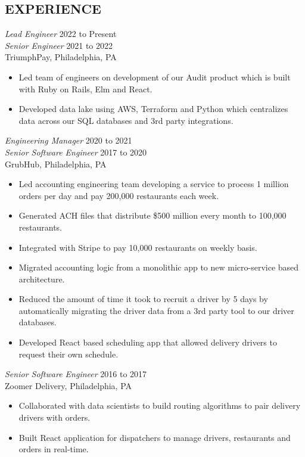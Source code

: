 \documentclass[line]{style}
\begin{document}
\newsectionwidth{0in}

\address{michaelcdalton@gmail.com}
\address{linkedin.com/in/michaelcdalton}

\begin{resume}

\section{EXPERIENCE}

{\sl Lead Engineer} \hfill 2022 to Present \\
{\sl Senior Engineer} \hfill 2021 to 2022 \\
TriumphPay, Philadelphia, PA
\begin{itemize} \itemsep -2pt
\item Led team of engineers on development of our Audit product which is built with Ruby on Rails, Elm and React.
\item Developed data lake using AWS, Terraform and Python which centralizes data across our SQL databases and 3rd party integrations.
\end{itemize}

{\sl Engineering Manager} \hfill 2020 to 2021 \\
{\sl Senior Software Engineer} \hfill 2017 to 2020 \\
GrubHub, Philadelphia, PA
\begin{itemize} \itemsep -2pt
\item Led accounting engineering team developing a service to process 1 million orders per day and pay 200,000 restaurants each week.
\item Generated ACH files that distribute \$500 million every month to 100,000 restaurants.
\item Integrated with Stripe to pay 10,000 restaurants on weekly basis.
\item Migrated accounting logic from a monolithic app to new micro-service based architecture.
\item Reduced the amount of time it took to recruit a driver by 5 days by automatically migrating the driver data from a 3rd party tool to our driver databases.
\item Developed React based scheduling app that allowed delivery drivers to request their own schedule.
\end{itemize}

{\sl Senior Software Engineer} \hfill 2016 to 2017 \\
Zoomer Delivery, Philadelphia, PA
\begin{itemize} \itemsep -2pt
\item Collaborated with data scientists to build routing algorithms to pair delivery drivers with orders.
\item Built React application for dispatchers to manage drivers, restaurants and orders in real-time.
\end{itemize}


\end{resume}
\end{document}
